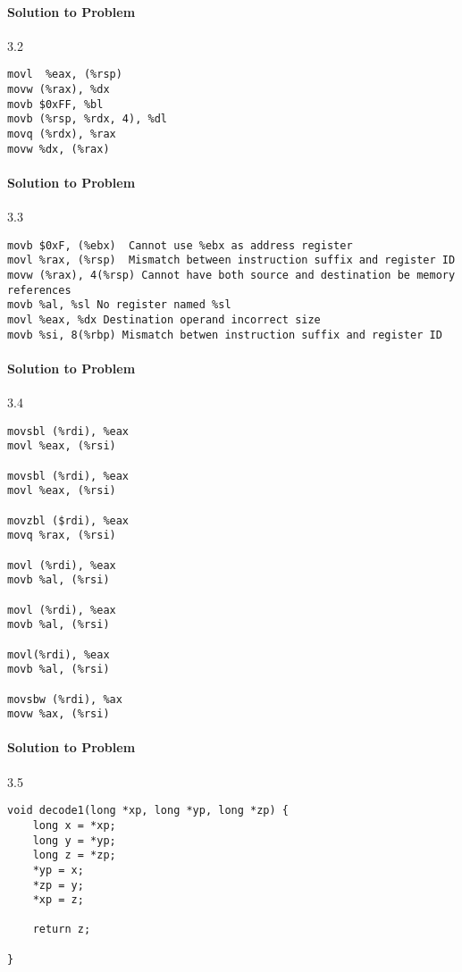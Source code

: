 \documentclass{report}
\begin{document}
\paragraph{Solution to Problem } 3.2 \\
\begin{lstlisting}
movl  %eax, (%rsp)
movw (%rax), %dx
movb $0xFF, %bl
movb (%rsp, %rdx, 4), %dl
movq (%rdx), %rax
movw %dx, (%rax)

\end{lstlisting}

\paragraph{Solution to Problem } 3.3 \\

\begin{lstlisting}
movb $0xF, (%ebx)  Cannot use %ebx as address register
movl %rax, (%rsp)  Mismatch between instruction suffix and register ID
movw (%rax), 4(%rsp) Cannot have both source and destination be memory references
movb %al, %sl No register named %sl
movl %eax, %dx Destination operand incorrect size
movb %si, 8(%rbp) Mismatch betwen instruction suffix and register ID

\end{lstlisting}


\paragraph{Solution to Problem } 3.4 \\
\begin{lstlisting}
movsbl (%rdi), %eax  
movl %eax, (%rsi)

movsbl (%rdi), %eax
movl %eax, (%rsi)

movzbl ($rdi), %eax
movq %rax, (%rsi)

movl (%rdi), %eax
movb %al, (%rsi)

movl (%rdi), %eax
movb %al, (%rsi)

movl(%rdi), %eax
movb %al, (%rsi)

movsbw (%rdi), %ax
movw %ax, (%rsi)
\end{lstlisting}

\paragraph{Solution to Problem } 3.5 \\
\begin{lstlisting}
void decode1(long *xp, long *yp, long *zp) {
    long x = *xp;
    long y = *yp;
    long z = *zp;
    *yp = x;
    *zp = y;
    *xp = z;
    
    return z;

}
\end{lstlisting}
\end{document}
